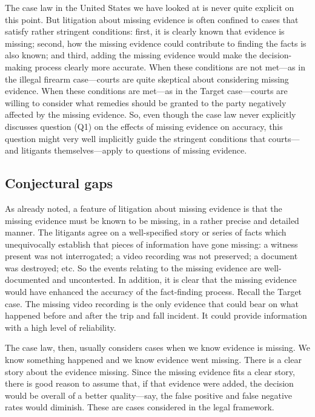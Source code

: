 \documentclass[
  10pt,
  dvipsnames,enabledeprecatedfontcommands]{scrartcl}
\begin{document}
The case law in the United States we have looked at is never quite
explicit on this point. But litigation about missing evidence is often
confined to cases that satisfy rather stringent conditions: first, it is
clearly known that evidence is missing; second, how the missing evidence
could contribute to finding the facts is also known; and third, adding
the missing evidence would make the decision-making process clearly more
accurate. When these conditions are not met---as in the illegal firearm
case---courts are quite skeptical about considering missing evidence.
When these conditions are met---as in the Target case---courts are
willing to consider what remedies should be granted to the party
negatively affected by the missing evidence. So, even though the case
law never explicitly discusses question (Q1) on the effects of missing
evidence on accuracy, this question might very well implicitly guide the
stringent conditions that courts---and litigants themselves---apply to
questions of missing evidence.

\hypertarget{conjectural-gaps}{%
\subsection{Conjectural gaps}\label{conjectural-gaps}}

As already noted, a feature of litigation about missing evidence is that
the missing evidence must be known to be missing, in a rather precise
and detailed manner. The litigants agree on a well-specified story or
series of facts which unequivocally establish that pieces of information
have gone missing: a witness present was not interrogated; a video
recording was not preserved; a document was destroyed; etc. So the
events relating to the missing evidence are well-documented and
uncontested. In addition, it is clear that the missing evidence would
have enhanced the accuracy of the fact-finding process. Recall the
Target case. The missing video recording is the only evidence that could
bear on what happened before and after the trip and fall incident. It
could provide information with a high level of reliability.

The case law, then, usually considers cases when we know evidence is
missing. We know something happened and we know evidence went missing.
There is a clear story about the evidence missing. Since the missing
evidence fits a clear story, there is good reason to assume that, if
that evidence were added, the decision would be overall of a better
quality---say, the false positive and false negative rates would
diminish. These are cases considered in the legal framework.
\end{document}

